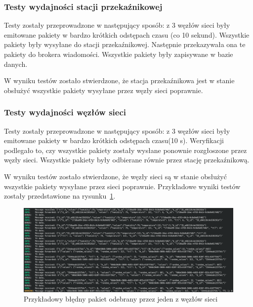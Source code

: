 \subsubsection{Testy wydajności stacji przekaźnikowej}
Testy zostały przeprowadzone w następujący sposób: z 3 węzłów sieci były emitowane pakiety w bardzo krótkich odstępach czasu (co 10 sekund). Wszystkie pakiety były wysyłane do stacji przekaźnikowej. Następnie przekazywała ona te pakiety do brokera wiadomości. Wszystkie pakiety były zapisywane w bazie danych.

W wyniku testów zostało stwierdzone, że stacja przekaźnikowa jest w stanie obsłużyć wszystkie pakiety wysyłane przez węzły sieci poprawnie.

\subsubsection{Testy wydajności węzłów sieci}
Testy zostały przeprowadzone w następujący sposób: z 3 węzłów sieci były emitowane pakiety w bardzo krótkich odstępach czasu(10 s). Weryfikacji podlegało to, czy wszystkie pakiety zostały wysłane ponownie rozgłoszone przez węzły sieci. Wszystkie pakiety były odbierane równie przez stację przekaźnikową.

W wyniku testów zostało stwierdzone, że węzły sieci są w stanie obsłużyć wszystkie pakiety wysyłane przez sieci poprawnie. Przykładowe wyniki testów zostały przedstawione na rysunku~\ref{rys:odbijanie-pakietu}.

\begin{figure}[b!]
    \begin{center}
        \includegraphics[width=13cm]{pic/odbijanie-pakietu.png}
    \end{center}
    \caption{Przykładowy błędny pakiet odebrany przez jeden z węzłów sieci}\label{rys:odbijanie-pakietu}
\end{figure}

